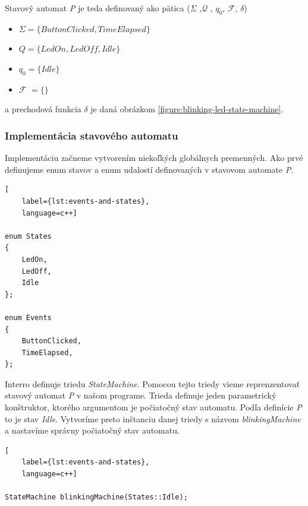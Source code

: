 Stavový automat \textit{P} je teda definovaný ako pätica ($\Sigma$ ,$\mathcal{Q}$ , $q_0$, $\mathcal{F}$, $\delta$)
\begin{itemize}
    \item \begin{math} \Sigma = \{ \textit{ButtonClicked}, \textit{TimeElapsed} \}  \end{math}
    \item \begin{math} Q = \{ \textit{LedOn}, \textit{LedOff}, \textit{Idle} \}  \end{math}
    \item \begin{math} q_0 = \{ \textit{Idle} \}  \end{math}
    \item $\mathcal{F}$ \begin{math} = \{ \}  \end{math}
\end{itemize}
a prechodová funkcia $\delta$ je daná obrázkom \ref{figure:blinking-led-state-machine}.

\subsubsection{Implementácia stavového automatu}
Implementáciu začneme vytvorením niekoľkých globálnych premenných. Ako prvé definujeme enum stavov a enum udalostí definovaných v stavovom automate \textit{P}.
\begin{lstlisting}[
    label={lst:events-and-states},
    language=c++]  

enum States
{
    LedOn,
    LedOff,
    Idle
};

enum Events
{
    ButtonClicked,
    TimeElapsed,
};    

\end{lstlisting}
Interro definuje triedu \textit{StateMachine}. Pomocou tejto triedy vieme reprenzentovať stavový automat \textit{P} v našom programe. Trieda definuje jeden
parametrický konštruktor, ktorého argumentom je počiatočný stav automatu. Podľa definície \textit{P} to je stav \textit{Idle}. Vytvoríme preto inštanciu danej triedy s
názvom \textit{blinkingMachine} a nastavíme správny počiatočný stav automatu.
\begin{lstlisting}[
    label={lst:events-and-states},
    language=c++]  

StateMachine blinkingMachine(States::Idle);

\end{lstlisting}

